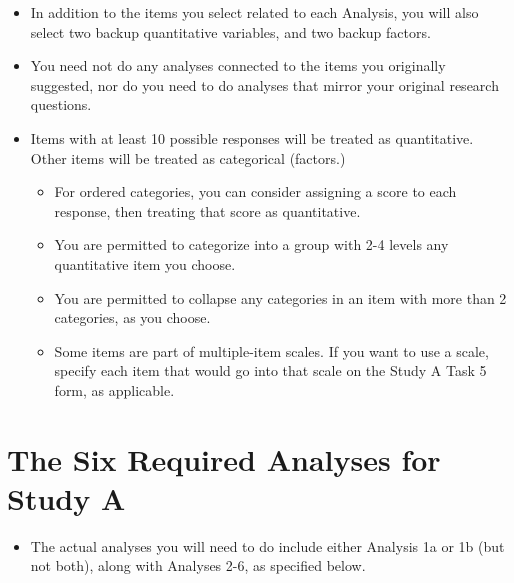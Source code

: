 \documentclass[]{book}
\providecommand{\tightlist}{%
  \setlength{\itemsep}{0pt}\setlength{\parskip}{0pt}}
\begin{document}
\begin{itemize}
\tightlist
\item
  In addition to the items you select related to each Analysis, you will also select two backup quantitative variables, and two backup factors.
\item
  You need not do any analyses connected to the items you originally suggested, nor do you need to do analyses that mirror your original research questions.
\item
  Items with at least 10 possible responses will be treated as quantitative. Other items will be treated as categorical (factors.)

  \begin{itemize}
  \tightlist
  \item
    For ordered categories, you can consider assigning a score to each response, then treating that score as quantitative.
  \item
    You are permitted to categorize into a group with 2-4 levels any quantitative item you choose.
  \item
    You are permitted to collapse any categories in an item with more than 2 categories, as you choose.
  \item
    Some items are part of multiple-item scales. If you want to use a scale, specify each item that would go into that scale on the Study A Task 5 form, as applicable.
  \end{itemize}
\end{itemize}

\hypertarget{the-six-required-analyses-for-study-a}{%
\section{The Six Required Analyses for Study A}\label{the-six-required-analyses-for-study-a}}

\begin{itemize}
\tightlist
\item
  The actual analyses you will need to do include either Analysis 1a or 1b (but not both), along with Analyses 2-6, as specified below.
\end{itemize}
\end{document}

